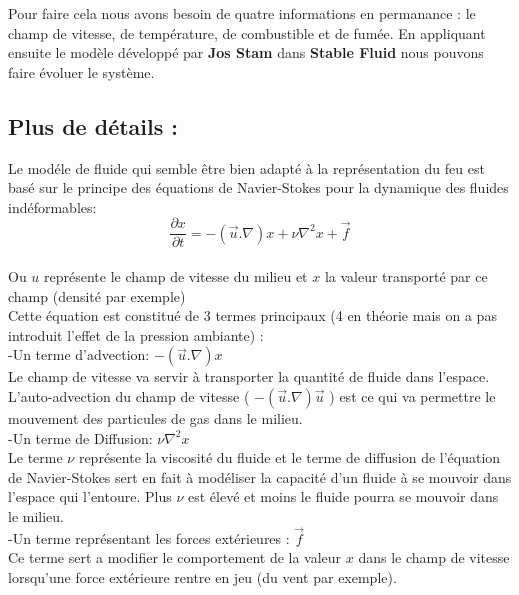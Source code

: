 \documentclass[a4paper,10pt]{article}
\begin{document}
Pour faire cela nous avons besoin de quatre informations en permanance
: le champ de vitesse, de température, de combustible et de fumée. En
appliquant ensuite le modèle développé par \textbf{Jos Stam} dans
\textbf{Stable Fluid} nous pouvons faire évoluer le système.\\

\subsection{Plus de détails :}
Le modéle de fluide qui semble être bien adapté à la représentation du feu est basé sur le principe 
des équations de Navier-Stokes pour la dynamique des fluides indéformables:\\
\begin{equation}
   \frac{\partial x}{\partial t} = -(\vec{u}.\nabla)x + \nu{\nabla^2}x+ \vec{f} 
\end{equation}
\\

Ou $u$ représente le champ de vitesse du milieu et $x$ la valeur transporté par ce champ (densité par exemple)\\



Cette équation est constitué de 3 termes principaux (4 en théorie mais on a pas introduit l'effet de la pression ambiante) :\\

-Un terme d'advection: $-(\vec{u}.\nabla)x$ \\
	Le champ de vitesse va servir à transporter la quantité de fluide dans l'espace. L'auto-advection du champ de vitesse 
( $-(\vec{u}.\nabla)\vec{u}$ ) est ce qui va permettre le mouvement des particules de gas dans le milieu.\\

-Un terme de Diffusion: $\nu{\nabla^2}x$ \\
	Le terme $\nu$ représente la viscosité du fluide et le terme de diffusion de l'équation de Navier-Stokes sert en fait à 
modéliser la capacité d'un fluide à se mouvoir dans l'espace qui l'entoure. Plus $\nu$ est élevé et moins le fluide pourra se mouvoir dans le milieu.\\

-Un terme représentant les forces extérieures : $\vec{f}$ \\
	Ce terme sert a modifier le comportement de la valeur $x$ dans le champ de vitesse lorsqu'une force extérieure rentre en jeu (du vent par exemple).
\end{document}
